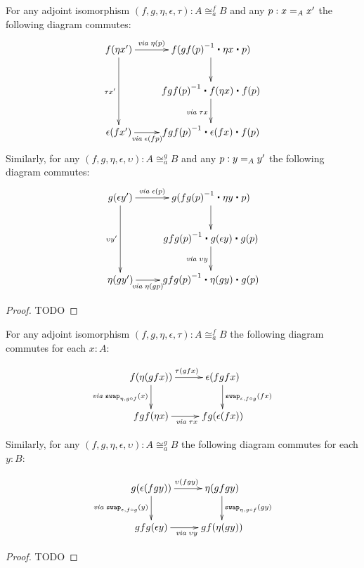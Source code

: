 \begin{cor}\label{lem:higher-hom}
For any adjoint isomorphism $(f,g,\eta,\epsilon,\tau) : A \cong_a^f B$ and any $p : \id[A]{x}{x'}$ the following diagram commutes:
\begin{align*}
\xymatrix{
f(\eta x') \ar[dd]_{\tau x'} \ar[r]^{\mathit{via \;} \eta(p) \;\;\;\;\; \; \;\;\;\;\;\;} & f(\opp{gf(p)} \ct \eta x \ct p) \ar[d] \\
& \opp{fgf(p)} \ct f(\eta x) \ct f(p) \ar[d]_{\mathit{via \;} \tau x} \\
\epsilon(f x') \ar[r]_{\mathit{via \;} \epsilon(fp)\;\;\;\;\; \; \;\;\;\;\;\;\;\;\;\;}  & \opp{fgf(p)} \ct \epsilon (fx) \ct f(p)}
\end{align*}
Similarly, for any $(f,g,\eta,\epsilon,\upsilon) : A \cong_a^g B$ and any $p : \id[A]{y}{y'}$ the following diagram commutes:
\begin{align*}
\xymatrix{
g(\epsilon y') \ar[dd]_{\upsilon y'} \ar[r]^{\mathit{via \;} \epsilon(p) \;\;\;\;\; \; \;\;\;\;\;\;} & g(\opp{fg(p)} \ct \eta y \ct p) \ar[d] \\
& \opp{gfg(p)} \ct g(\epsilon y) \ct g(p) \ar[d]_{\mathit{via \;} \upsilon y} \\
\eta(g y') \ar[r]_{\mathit{via \;} \eta(gp)\;\;\;\;\; \; \;\;\;\;\;\;\;\;\;\;}  & \opp{gfg(p)} \ct \eta (gy) \ct g(p)}
\end{align*}
\end{cor}
\begin{proof}
TODO
\end{proof}

\begin{lem}\label{lem:coh-fg}
For any adjoint isomorphism $(f,g,\eta,\epsilon,\tau) : A \cong_a^f B$ the following diagram commutes for each $x : A$:

\begin{align*}
\xymatrix{
f(\eta (g f x)) \ar[d]_{\mathit{via \; } \com{\eta}{g \circ f}{x}} \ar[r]^{\tau(gfx)} &
\epsilon (fgfx) \ar[d]^{\com{\epsilon}{f\circ g}{fx}} \\
fgf (\eta x) \ar[r]_{\mathit{via \;} \tau x} &
fg(\epsilon (f x))} 
\end{align*}

Similarly, for any $(f,g,\eta,\epsilon,\upsilon) : A \cong_a^g B$ the following diagram commutes for each $y : B$:

\begin{align*}
\xymatrix{
g(\epsilon (f g y)) \ar[d]_{\mathit{via \; } \com{\epsilon}{f \circ g}{y}} \ar[r]^{\upsilon(fgy)} &
\eta (gfgy) \ar[d]^{\com{\eta}{g\circ f}{gy}} \\
gfg (\epsilon y) \ar[r]_{\mathit{via \;} \upsilon y} &
gf(\eta (g y))} 
\end{align*}
\end{lem}
\begin{proof}
TODO
\end{proof}

